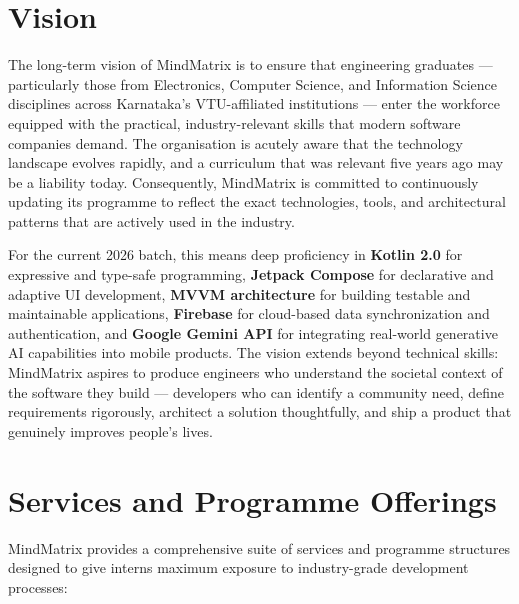 \documentclass[12pt,a4paper]{report}
\begin{document}
\section{Vision}

The long-term vision of MindMatrix is to ensure that engineering graduates — particularly those from Electronics, Computer Science, and Information Science disciplines across Karnataka's VTU-affiliated institutions — enter the workforce equipped with the practical, industry-relevant skills that modern software companies demand. The organisation is acutely aware that the technology landscape evolves rapidly, and a curriculum that was relevant five years ago may be a liability today. Consequently, MindMatrix is committed to continuously updating its programme to reflect the exact technologies, tools, and architectural patterns that are actively used in the industry.

\vspace{0.4cm}

For the current 2026 batch, this means deep proficiency in \textbf{Kotlin 2.0} for expressive and type-safe programming, \textbf{Jetpack Compose} for declarative and adaptive UI development, \textbf{MVVM architecture} for building testable and maintainable applications, \textbf{Firebase} for cloud-based data synchronization and authentication, and \textbf{Google Gemini API} for integrating real-world generative AI capabilities into mobile products. The vision extends beyond technical skills: MindMatrix aspires to produce engineers who understand the societal context of the software they build — developers who can identify a community need, define requirements rigorously, architect a solution thoughtfully, and ship a product that genuinely improves people's lives.

\section{Services and Programme Offerings}

MindMatrix provides a comprehensive suite of services and programme structures designed to give interns maximum exposure to industry-grade development processes:
\end{document}
